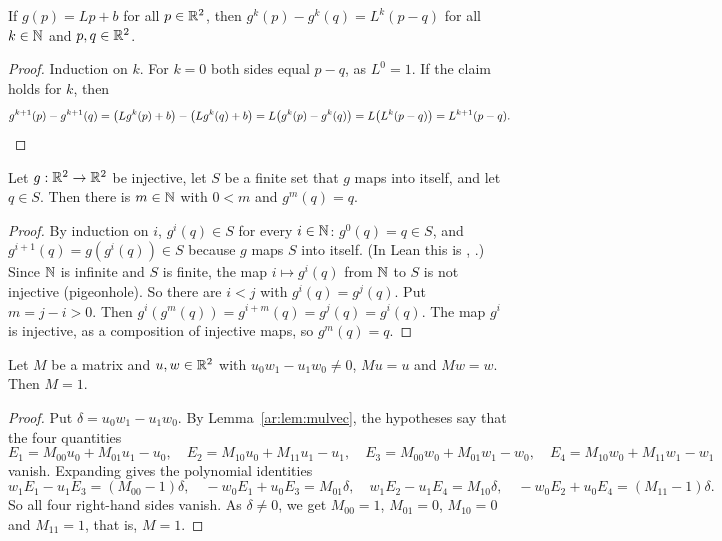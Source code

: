 \begin{lemma}\label{ar:lem:iter}
If $g(p)=Lp+b$ for all $p\in\mathbb R^2$, then $g^k(p)-g^k(q)=L^k(p-q)$ for all $k\in\mathbb N$ and $p,q\in\mathbb R^2$.
\end{lemma}

\begin{proof}
Induction on $k$. For $k=0$ both sides equal $p-q$, as $L^0=1$. If the claim holds for $k$, then
\[
g^{k+1}(p)-g^{k+1}(q)=\bigl(Lg^k(p)+b\bigr)-\bigl(Lg^k(q)+b\bigr)=L\bigl(g^k(p)-g^k(q)\bigr)=L\bigl(L^k(p-q)\bigr)
=L^{k+1}(p-q).\qedhere
\]
\end{proof}

\begin{lemma}\label{ar:lem:periodic}
Let $g:\mathbb R^2\to\mathbb R^2$ be injective, let $S$ be a finite set that $g$ maps into itself, and let $q\in S$. Then there is
$m\in\mathbb N$ with $0<m$ and $g^m(q)=q$.
\end{lemma}

\begin{proof}
By induction on $i$, $g^i(q)\in S$ for every $i\in\mathbb N$: $g^0(q)=q\in S$, and $g^{i+1}(q)=g(g^i(q))\in S$ because $g$
maps $S$ into itself. (In Lean this is , .) Since $\mathbb N$ is
infinite and $S$ is finite, the map $i\mapsto g^i(q)$ from $\mathbb N$ to $S$ is not injective (pigeonhole). So there are
$i<j$ with $g^i(q)=g^j(q)$. Put $m=j-i>0$. Then $g^i(g^m(q))=g^{i+m}(q)=g^j(q)=g^i(q)$. The map $g^i$ is injective, as
a composition of injective maps, so $g^m(q)=q$.
\end{proof}

\begin{lemma}\label{ar:lem:fix}
Let $M$ be a matrix and $u,w\in\mathbb R^2$ with $u_0w_1-u_1w_0\ne0$, $Mu=u$ and $Mw=w$. Then $M=1$.
\end{lemma}

\begin{proof}
Put $\delta=u_0w_1-u_1w_0$. By Lemma~\ref{ar:lem:mulvec}, the hypotheses say that the four quantities
\[
E_1=M_{00}u_0+M_{01}u_1-u_0,\quad E_2=M_{10}u_0+M_{11}u_1-u_1,\quad
E_3=M_{00}w_0+M_{01}w_1-w_0,\quad E_4=M_{10}w_0+M_{11}w_1-w_1
\]
vanish. Expanding gives the polynomial identities
\[
w_1E_1-u_1E_3=(M_{00}-1)\delta,\quad -w_0E_1+u_0E_3=M_{01}\delta,\quad
w_1E_2-u_1E_4=M_{10}\delta,\quad -w_0E_2+u_0E_4=(M_{11}-1)\delta .
\]
So all four right-hand sides vanish. As $\delta\ne0$, we get $M_{00}=1$, $M_{01}=0$, $M_{10}=0$ and $M_{11}=1$, that
is, $M=1$.
\end{proof}

